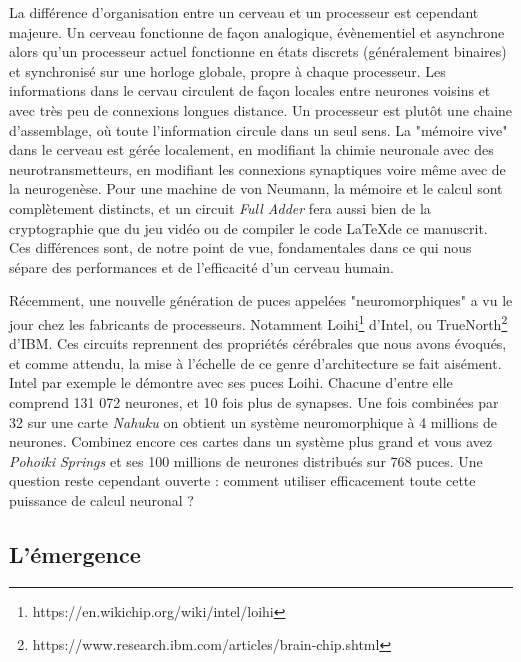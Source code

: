 	La différence d'organisation entre un cerveau et un processeur est cependant majeure. Un cerveau fonctionne de façon analogique, évènementiel et asynchrone alors qu'un processeur actuel fonctionne en états discrets (généralement binaires) et synchronisé sur une horloge globale, propre à chaque processeur. Les informations dans le cervau circulent de façon locales entre neurones voisins et avec très peu de connexions longues distance. Un processeur est plutôt une chaine d'assemblage, où toute l'information circule dans un seul sens. La "mémoire vive" dans le cerveau est gérée localement, en modifiant la chimie neuronale avec des neurotransmetteurs, en modifiant les connexions synaptiques voire même avec de la neurogenèse. Pour une machine de von Neumann, la mémoire et le calcul sont complètement distincts, et un circuit \textit{Full Adder} fera aussi bien de la cryptographie que du jeu vidéo ou de compiler le code \LaTeX de ce manuscrit. Ces différences sont, de notre point de vue, fondamentales dans ce qui nous sépare des performances et de l'efficacité d'un cerveau humain.

	Récemment, une nouvelle génération de puces appelées "neuromorphiques" a vu le jour chez les fabricants de processeurs. Notamment Loihi\footnote{https://en.wikichip.org/wiki/intel/loihi} d'Intel, ou TrueNorth\footnote{https://www.research.ibm.com/articles/brain-chip.shtml} d'IBM. Ces circuits reprennent des propriétés cérébrales que nous avons évoqués, et comme attendu, la mise à l'échelle de ce genre d'architecture se fait aisément. Intel par exemple le démontre avec ses puces Loihi. Chacune d'entre elle comprend 131 072 neurones, et 10 fois plus de synapses. Une fois combinées par 32 sur une carte \textit{Nahuku} on obtient un système neuromorphique à 4 millions de neurones. Combinez encore ces cartes dans un système plus grand et vous avez \textit{Pohoiki Springs} et ses 100 millions de neurones distribués sur 768 puces. Une question reste cependant ouverte : comment utiliser efficacement toute cette puissance de calcul neuronal ?

\subsection{L'émergence}

